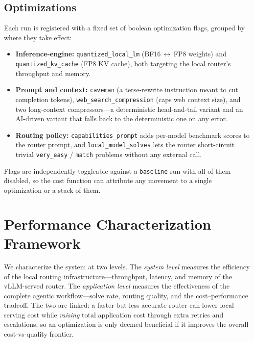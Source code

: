 \documentclass[10pt]{article}
\begin{document}
\subsection{Optimizations}
\label{sec:optimizations}
Each run is registered with a fixed set of boolean optimization flags, grouped by
where they take effect:
\begin{itemize}
  \item \textbf{Inference-engine:} \texttt{quantized\_local\_lm}
        (BF16\,$\leftrightarrow$\,FP8 weights) and \texttt{quantized\_kv\_cache}
        (FP8 KV cache), both targeting the local router's throughput and memory.
  \item \textbf{Prompt and context:} \texttt{caveman} (a terse-rewrite instruction
        meant to cut completion tokens), \texttt{web\_search\_compression} (caps web
        context size), and two long-context compressors---a deterministic
        head-and-tail variant and an AI-driven variant that falls back to the
        deterministic one on any error.
  \item \textbf{Routing policy:} \texttt{capabilities\_prompt} adds per-model
        benchmark scores to the router prompt, and \texttt{local\_model\_solves} lets
        the router short-circuit trivial \texttt{very\_easy} / \texttt{match}
        problems without any external call.
\end{itemize}
Flags are independently toggleable against a \texttt{baseline} run with all of them
disabled, so the cost function can attribute any movement to a single optimization or
a stack of them.

\section{Performance Characterization Framework}
\label{sec:characterization}
We characterize the system at two levels. The \emph{system level} measures the
efficiency of the local routing infrastructure---throughput, latency, and memory of
the vLLM-served router. The \emph{application level} measures the effectiveness of the
complete agentic workflow---solve rate, routing quality, and the cost--performance
tradeoff. The two are linked: a faster but less accurate router can lower local
serving cost while \emph{raising} total application cost through extra retries and
escalations, so an optimization is only deemed beneficial if it improves the overall
cost-vs-quality frontier.
\end{document}
